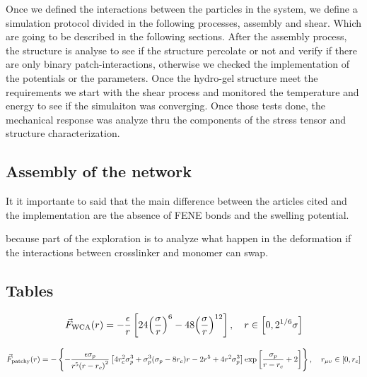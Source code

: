 \documentclass[../main.tex]{subfiles}
\begin{document}
Once we defined the interactions between the particles in the system, we define a simulation protocol divided in the following processes, assembly and shear.
Which are going to be described in the following sections.
After the assembly process, the structure is analyse to see if the structure percolate or not and verify if there are only binary patch-interactions, otherwise we checked the implementation of the potentials or the parameters.
Once the hydro-gel structure meet the requirements we start with the shear process and monitored the temperature and energy to see if the simulaiton was converging.
Once those tests done, the mechanical response was analyze thru the components of the stress tensor and structure characterization.

\subsection{Assembly of the network}

It it importante to said that the main difference between the articles cited and the implementation are the absence of FENE bonds and the swelling potential.

because part of the exploration is to analyze what happen in the deformation if the interactions between crosslinker and monomer can swap.

\subsection{Tables}



\begin{gather}
\vec{F}_{\mathrm{WCA}}(r) = -\frac{\epsilon}{r}\left[24\qty(\frac{\sigma}{r})^6-48\qty(\frac{\sigma}{r})^{12}\right],\quad r\in\qty[0,2^{1/6}\sigma] 
\end{gather}


\begin{gather}
    \vec{F}_{\mathrm{patchy}}(r) =-\left\{ -\frac{\epsilon\sigma_p}{r^5\qty(r-r_c)^2} \left[ 4r_c^2\sigma^3_p + \sigma^3_p\qty(\sigma_p-8r_c) r -2r^5 + 4r^2 \sigma^3_p \right] \exp\left[\frac{\sigma_p}{r-r_c}+2\right]\right\},\quad r_{\mu\upsilon}\in\qty[0,r_c]
\end{gather}
\end{document}
